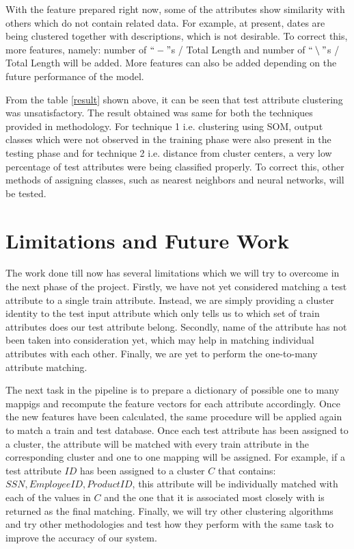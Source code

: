 \documentclass[conference]{IEEEtran}
\begin{document}
With the feature prepared right now, some of the attributes show similarity with others which do not contain related data. For example, at present, dates are being clustered together with descriptions, which is not desirable. To correct this, more features, namely: number of $``-"$s / Total Length and number of $``\setminus"$s / Total Length will be added. More features can also be added depending on the future performance of the model.

From the table \ref{result} shown above, it can be seen that test attribute clustering was unsatisfactory. The result obtained was same for both the techniques provided in methodology. For technique 1 i.e. clustering using SOM, output classes which were not observed in the training phase were also present in the testing phase and for technique 2 i.e. distance from cluster centers, a very low percentage of test attributes were being classified properly. To correct this, other methods of assigning classes, such as nearest neighbors and neural networks, will be tested.


\section{Limitations and Future Work}
The work done till now has several limitations which we will try to overcome in the next phase of the project. Firstly, we have not yet considered matching a test attribute to a single train attribute. Instead, we are simply providing a cluster identity to the test input attribute which only tells us to which set of train attributes does our test attribute belong. Secondly, name of the attribute has not been taken into consideration yet, which may help in matching individual attributes with each other. Finally, we are yet to perform the one-to-many attribute matching. 

The next task in the pipeline is to prepare a dictionary of possible one to many mappigs and recompute the feature vectors for each attribute accordingly. Once the new features have been calculated, the same procedure will be applied again to match a train and test database. Once each test attribute has been assigned to a cluster, the attribute will be matched with every train attribute in the corresponding cluster and one to one mapping will be assigned. For example, if a test attribute $ID$ has been assigned to a cluster $C$ that contains: ${SSN, Employee ID, Product ID}$, this attribute will be individually matched with each of the values in $C$ and the one that it is associated most closely with is returned as the final matching. Finally, we will try other clustering algorithms and try other methodologies and test how they perform with the same task to improve the accuracy of our system.
\end{document}

